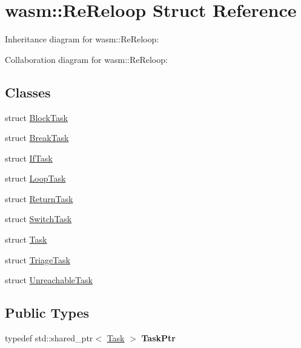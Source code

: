 \hypertarget{structwasm_1_1_re_reloop}{}\section{wasm\+:\+:Re\+Reloop Struct Reference}
\label{structwasm_1_1_re_reloop}


Inheritance diagram for wasm\+:\+:Re\+Reloop\+:


Collaboration diagram for wasm\+:\+:Re\+Reloop\+:
\subsection*{Classes}
\begin{DoxyCompactItemize}
\item 
struct \mbox{\hyperlink{structwasm_1_1_re_reloop_1_1_block_task}{Block\+Task}}
\item 
struct \mbox{\hyperlink{structwasm_1_1_re_reloop_1_1_break_task}{Break\+Task}}
\item 
struct \mbox{\hyperlink{structwasm_1_1_re_reloop_1_1_if_task}{If\+Task}}
\item 
struct \mbox{\hyperlink{structwasm_1_1_re_reloop_1_1_loop_task}{Loop\+Task}}
\item 
struct \mbox{\hyperlink{structwasm_1_1_re_reloop_1_1_return_task}{Return\+Task}}
\item 
struct \mbox{\hyperlink{structwasm_1_1_re_reloop_1_1_switch_task}{Switch\+Task}}
\item 
struct \mbox{\hyperlink{structwasm_1_1_re_reloop_1_1_task}{Task}}
\item 
struct \mbox{\hyperlink{structwasm_1_1_re_reloop_1_1_triage_task}{Triage\+Task}}
\item 
struct \mbox{\hyperlink{structwasm_1_1_re_reloop_1_1_unreachable_task}{Unreachable\+Task}}
\end{DoxyCompactItemize}
\subsection*{Public Types}
\begin{DoxyCompactItemize}
\item 
\mbox{\label{structwasm_1_1_re_reloop_a84f7124d4a643b2061265e44bfd4bfb0}} 
typedef std\+::shared\+\_\+ptr$<$ \mbox{\hyperlink{structwasm_1_1_re_reloop_1_1_task}{Task}} $>$ {\bfseries Task\+Ptr}
\end{DoxyCompactItemize}
